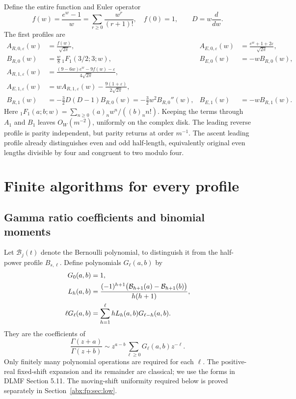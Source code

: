 \documentclass[11pt,letterpaper]{article}
\numberwithin{equation}{section}
\theoremstyle{remark}\newtheorem{remark}[theorem]{Remark}
\newcommand{\eps}{\varepsilon}
\newcommand{\sq}{\sqrt{2\pi}}
\begin{document}
Define the entire function and Euler operator
\begin{equation}\label{abx:fp:eq:fD}
 f(w)=\frac{e^w-1}{w}=\sum_{r\ge0}\frac{w^r}{(r+1)!},\quad f(0)=1,
 \qquad D=w\frac{d}{dw}.
\end{equation}
The first profiles are
\begin{align}
 A_{R,0,\eps}(w)&=\frac{f(w)}{\sq},&
 A_{E,0,\eps}(w)&=\frac{e^w+1+2\eps}{\sq},\label{abx:fp:eq:leading}\\
 B_{R,0}(w)&=\frac w8\,{}_1F_1(3/2;3;w),&
 B_{E,0}(w)&=-wB_{R,0}(w),\label{abx:fp:eq:half}\\
 A_{R,1,\eps}(w)&=\frac{(9-6w)e^w-9f(w)-\eps}{4\sq},\label{abx:fp:eq:Aone}\\
 A_{E,1,\eps}(w)&=wA_{R,1,\eps}(w)-\frac{9(1+\eps)}{2\sq},\label{abx:fp:eq:AEone}\\
 B_{R,1}(w)&=-\frac32D(D-1)B_{R,0}(w)
             =-\frac32w^2B_{R,0}''(w),&
 B_{E,1}(w)&=-wB_{R,1}(w).\label{abx:fp:eq:Bone}
\end{align}
Here ${}_1F_1(a;b;w)=\sum_{n\ge0}(a)_nw^n/((b)_n n!)$.
Keeping the terms through $A_1$ and $B_1$ leaves
$O_W(m^{-2})$, uniformly on the complex disk.
The leading reverse profile is parity independent, but parity returns
at order $m^{-1}$. The ascent leading profile already distinguishes
even and odd half-length, equivalently original even lengths divisible
by four and congruent to two modulo four.

\section{Finite algorithms for every profile}\label{abx:fp:sec:algorithms}
\subsection{Gamma ratio coefficients and binomial moments}\label{abx:fp:sub:gamma}
Let $\mathcal B_j(t)$ denote the Bernoulli polynomial, to distinguish
it from the half-power profile $B_{s,\ell}$. Define polynomials
$G_\ell(a,b)$ by
\begin{align}
 G_0(a,b)&=1,\notag\\
 L_h(a,b)&=\frac{(-1)^{h+1}\bigl(\mathcal B_{h+1}(a)-
                       \mathcal B_{h+1}(b)\bigr)}{h(h+1)},\label{abx:fp:eq:logG}\\
 \ell G_\ell(a,b)&=\sum_{h=1}^{\ell}hL_h(a,b)G_{\ell-h}(a,b).
 \label{abx:fp:eq:Grec}
\end{align}
They are the coefficients of
\[
 \frac{\Gamma(z+a)}{\Gamma(z+b)}
 \sim z^{a-b}\sum_{\ell\ge0}G_\ell(a,b)z^{-\ell}.
\]
Only finitely many polynomial operations are required for each $\ell$.
The positive-real fixed-shift expansion and its remainder are classical;
we use the forms in DLMF Section 5.11\cite{dlmf}. The moving-shift
uniformity required below is proved separately in Section~\ref{abx:fp:sec:low}.
\end{document}
